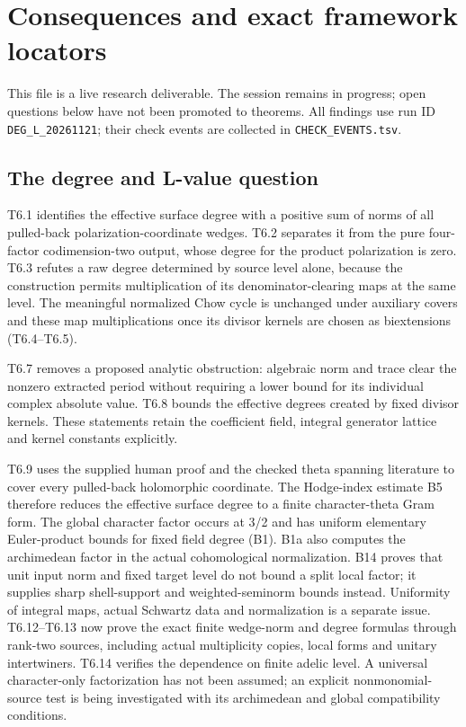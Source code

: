 \documentclass[11pt,a4paper]{article}
\theoremstyle{definition}
\begin{document}
\section{Consequences and exact framework locators}

This file is a live research deliverable. The session remains in
progress; open questions below have not been promoted to theorems. All
findings use run ID \texttt{DEG\_L\_20261121}; their check events are
collected in \texttt{CHECK\_EVENTS.tsv}.

\subsection{The degree and L-value
question}\label{the-degree-and-l-value-question}

T6.1 identifies the effective surface degree with a positive sum of
norms of all pulled-back polarization-coordinate wedges. T6.2 separates
it from the pure four-factor codimension-two output, whose degree for
the product polarization is zero. T6.3 refutes a raw degree determined
by source level alone, because the construction permits multiplication
of its denominator-clearing maps at the same level. The meaningful
normalized Chow cycle is unchanged under auxiliary covers and these map
multiplications once its divisor kernels are chosen as biextensions
(T6.4--T6.5).

T6.7 removes a proposed analytic obstruction: algebraic norm and trace
clear the nonzero extracted period without requiring a lower bound for
its individual complex absolute value. T6.8 bounds the effective degrees
created by fixed divisor kernels. These statements retain the
coefficient field, integral generator lattice and kernel constants
explicitly.

T6.9 uses the supplied human proof and the checked theta spanning
literature to cover every pulled-back holomorphic coordinate. The
Hodge-index estimate B5 therefore reduces the effective surface degree
to a finite character-theta Gram form. The global character factor
occurs at 3/2 and has uniform elementary Euler-product bounds for fixed
field degree (B1). B1a also computes the archimedean factor in the
actual cohomological normalization. B14 proves that unit input norm and
fixed target level do not bound a split local factor; it supplies sharp
shell-support and weighted-seminorm bounds instead. Uniformity of
integral maps, actual Schwartz data and normalization is a separate
issue. T6.12--T6.13 now prove the exact finite wedge-norm and degree
formulas through rank-two sources, including actual multiplicity copies,
local forms and unitary intertwiners. T6.14 verifies the dependence on
finite adelic level. A universal character-only factorization has not
been assumed; an explicit nonmonomial-source test is being investigated
with its archimedean and global compatibility conditions.
\end{document}
